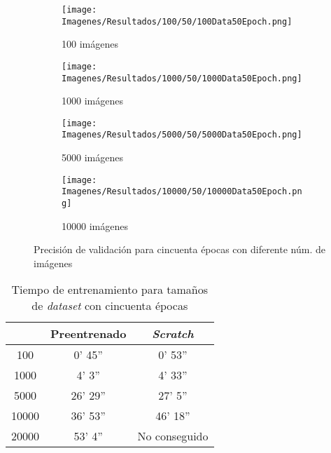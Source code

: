 \documentclass{report}
\begin{document}
\begin{figure}[H]
	 	\centering
	 	\begin{subfigure}[b]{0.45\linewidth}
	 	\centering
	 		\texttt{[image: Imagenes/Resultados/100/50/100Data50Epoch.png]}
	 		\caption{ 100 imágenes }
                    \label{fig:50Epo100D}
	 	\end{subfigure}
	 	\begin{subfigure}[b]{0.45\linewidth}
	 	\centering
	 		\texttt{[image: Imagenes/Resultados/1000/50/1000Data50Epoch.png]}
	 		\caption{ 1000 imágenes }
                    \label{fig:50Epo1000D}
	 	\end{subfigure}
	 	\centering
	 	\begin{subfigure}[b]{0.45\linewidth}
	 	\centering
	 		\texttt{[image: Imagenes/Resultados/5000/50/5000Data50Epoch.png]}
	 		\caption{ 5000 imágenes }
                    \label{fig:50Epo5000D}
	 	\end{subfigure}
	 	\centering
	 	\begin{subfigure}[b]{0.45\linewidth}
	 	\centering
	 		\texttt{[image: Imagenes/Resultados/10000/50/10000Data50Epoch.png]}
	 		\caption{ 10000 imágenes }
                    \label{fig:50Epo10000D}
	 	\end{subfigure}
	 	\caption{ Precisión de validación para cincuenta épocas con diferente núm. de imágenes }
	 	\label{fig:50E}
\end{figure}

\begin{table}[H]
\centering
\begin{tabular}{|c|c|c|}
\hline
\cellcolor[HTML]{FFFFFF}{\color[HTML]{000000} Tamaño dataset} & Preentrenado & \textit{Scratch}\\ \hline
100    &  0' 45''  &  0' 53''  \\ \hline
1000   &  4' 3''  &  4' 33''  \\ \hline
5000   &  26' 29''  &  27' 5''\\ \hline
10000  &  36' 53''  &  46' 18''  \\ \hline
20000  &  53' 4'' &  No conseguido\\ \hline
\end{tabular}
\caption{Tiempo de entrenamiento para tamaños de \textit{dataset} con cincuenta épocas}
\label{tab:tiempoPreVsScratch50E}
\end{table}
\end{document}
